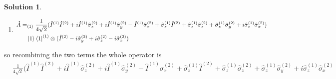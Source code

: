 \documentclass[10pt]{article}
\theoremstyle{definition}
\newtheorem{soln}{Solution}
\begin{document}
\begin{soln}
\begin{enumerate}[label=(\alph*)]
\begin{enumerate}[label=(\arabic*)]
                  \begin{align*}
                    \hat{A} & = \frac{1}{4\sqrt{2}}(\hat{I}^{(1)}-i\hat{\sigma}_z^{(1)})(\hat{I}^{(2)}+i\hat{\sigma}_z^{(2)}+i\hat{\sigma}_y^{(2)}-\hat{\sigma}_x^{(2)}) \\
                            & \quad\ket{0}\bra{0}^{(1)}\otimes(\hat{I}^{(2)}-i\hat{\sigma}_y^{(2)}-i\hat{\sigma}_z^{(2)}+i\hat{\sigma}_x^{(2)})                          \\
                            & = \frac{1}{4\sqrt{2}}
                    (
                    \hat{I}^{(1)}\hat{I}^{(2)}+i\hat{I}^{(1)}\hat{\sigma}_z^{(2)}+i\hat{I}^{(1)}\hat{\sigma}_y^{(2)}-\hat{I}^{(1)}\hat{\sigma}_x^{(2)}
                    +\hat{\sigma}_z^{(1)}\hat{I}^{(2)}+\hat{\sigma}_z^{(1)}\hat{\sigma}_z^{(2)}+\hat{\sigma}_z^{(1)}\hat{\sigma}_y^{(2)}+i\hat{\sigma}_z^{(1)}\hat{\sigma}_x^{(2)}
                    )
                    \\
                            & \quad\ket{0}\bra{0}^{(1)}\otimes(\hat{I}^{(2)}-i\hat{\sigma}_y^{(2)}-i\hat{\sigma}_z^{(2)}+i\hat{\sigma}_x^{(2)})                          \\
                  \end{align*}
            \item \begin{align*}
                    \hat{A} &
                    =_{(1)}\frac{1}{4\sqrt{2}}
                    (
                    \hat{I}^{(1)}\hat{I}^{(2)}+i\hat{I}^{(1)}\hat{\sigma}_z^{(2)}+i\hat{I}^{(1)}\hat{\sigma}_y^{(2)}-\hat{I}^{(1)}\hat{\sigma}_x^{(2)}
                    +\hat{\sigma}_z^{(1)}\hat{I}^{(2)}+\hat{\sigma}_z^{(1)}\hat{\sigma}_z^{(2)}+\hat{\sigma}_z^{(1)}\hat{\sigma}_y^{(2)}+i\hat{\sigma}_z^{(1)}\hat{\sigma}_x^{(2)}
                    )
                    \\
                            & \quad\ket{1}\bra{1}^{(1)}\otimes(\hat{I}^{(2)}-i\hat{\sigma}_y^{(2)}+i\hat{\sigma}_z^{(2)}-i\hat{\sigma}_x^{(2)}) \\
                  \end{align*}
          \end{enumerate}
          so recombining the two terms the whole operator is
          \begin{align*}
             & \frac{1}{4\sqrt{2}}
            (
            \hat{I}^{(1)}\hat{I}^{(2)}+i\hat{I}^{(1)}\hat{\sigma}_z^{(2)}+i\hat{I}^{(1)}\hat{\sigma}_y^{(2)}-\hat{I}^{(1)}\hat{\sigma}_x^{(2)}
            +\hat{\sigma}_z^{(1)}\hat{I}^{(2)}+\hat{\sigma}_z^{(1)}\hat{\sigma}_z^{(2)}+\hat{\sigma}_z^{(1)}\hat{\sigma}_y^{(2)}+i\hat{\sigma}_z^{(1)}\hat{\sigma}_x^{(2)}

\end{align*}
\end{enumerate}
\end{soln}
\end{document}

